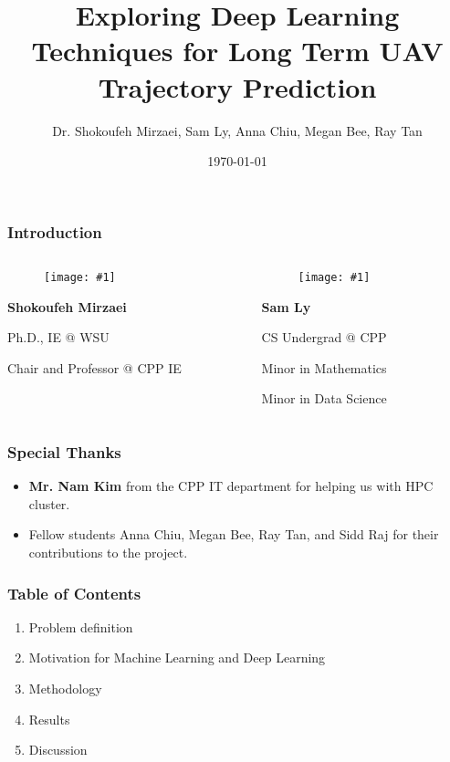 \documentclass{beamer}
\title{
    Exploring Deep Learning Techniques for Long Term UAV Trajectory Prediction
}
\author{
    Dr. Shokoufeh Mirzaei, Sam Ly, Anna Chiu, Megan Bee, Ray Tan
}
\institute{Cal Poly Pomona}
\date{\today}
\newcommand{\personcard}[3]{
    \begin{minipage}{10em}
        \centering
        \begin{figure}
            \texttt{[image: \#1]}
        \end{figure}
        \textbf{#2}

        \small
        #3
    \end{minipage}%
}
\begin{document}
\begin{frame}
    \titlepage
\end{frame}

\begin{frame}
    \frametitle{Introduction}
    \centering

    \begin{columns}
        \begin{column}{10em}
            \personcard{resources/mirzaei.png}{Shokoufeh Mirzaei}{
                Ph.D., IE @ WSU

                Chair and Professor @ CPP IE
            }
        \end{column}
        
        \begin{column}{10em}
            \personcard{resources/sam.png}{Sam Ly}{
                CS Undergrad @ CPP

                Minor in Mathematics

                Minor in Data Science
            }
        \end{column}
    \end{columns}

\end{frame}

\begin{frame}
    \frametitle{Special Thanks}

    \begin{itemize}
        \item \textbf{Mr. Nam Kim} from the CPP IT department for helping us with HPC cluster.
        \item Fellow students Anna Chiu, Megan Bee, Ray Tan, and Sidd Raj for their contributions to the project.
    \end{itemize}
\end{frame}

\begin{frame}
    \frametitle{Table of Contents}

    \begin{enumerate}
        \item Problem definition
        \item Motivation for Machine Learning and Deep Learning
        \item Methodology
        \item Results
        \item Discussion
    \end{enumerate}
\end{frame}
\end{document}
